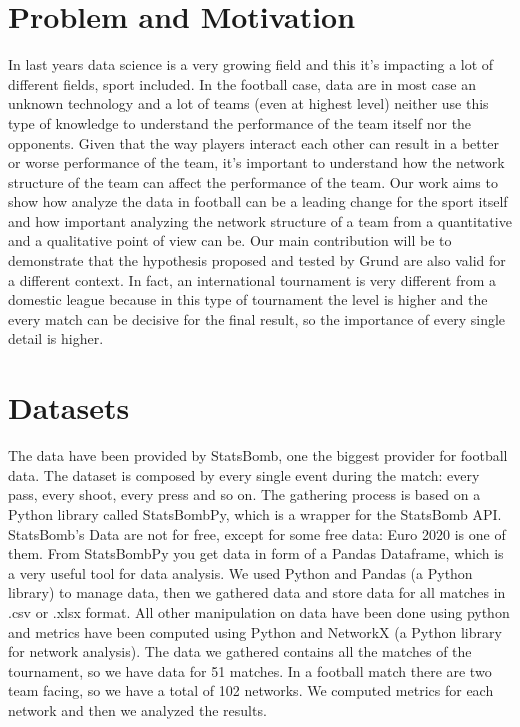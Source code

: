 \documentclass[12pt, a4paper]{article}
\begin{document}
\section{Problem and Motivation}
\label{problem-and-motivation}
In last years data science is a very growing field and this it's impacting a lot of different fields, sport included. In the football case, data are in most case an unknown technology and a lot of teams (even at highest level) neither use this type of knowledge to understand the performance of the team itself nor the opponents. Given that the way players interact each other can result in a better or worse performance of the team, it's important to understand how the network structure of the team can affect the performance of the team. Our work aims to show how analyze the data in football can be a leading change for the sport itself and how important analyzing the network structure of a team from a quantitative and a qualitative point of view can be. Our main contribution will be to demonstrate that the hypothesis proposed and tested by Grund \cite{GRUND} are also valid for a different context. In fact, an international tournament is very different from a domestic league because in this type of tournament the level is higher and the every match can be decisive for the final result, so the importance of every single detail is higher. 


\section{Datasets}
\label{datasets}
The data have been provided by StatsBomb, one the biggest provider for football data. The dataset is composed by every single event during the match: every pass, every shoot, every press and so on. 
The gathering process is based on a Python library called StatsBombPy, which is a wrapper for the StatsBomb API. 
StatsBomb's Data are not for free, except for some free data: Euro 2020 is one of them. From StatsBombPy you get data in form of a Pandas Dataframe, which is a very useful tool for data analysis. We used Python and Pandas (a Python library) to manage data, then we gathered data and store data for all matches in .csv or .xlsx format. All other manipulation on data have been done using python and metrics have been computed using Python and  NetworkX (a Python library for network analysis). The data we gathered contains all the matches of the tournament, so we have data for 51 matches. In a football match there are two team facing, so we have a total of 102 networks. We computed metrics for each network and then we analyzed the results.
\end{document}
